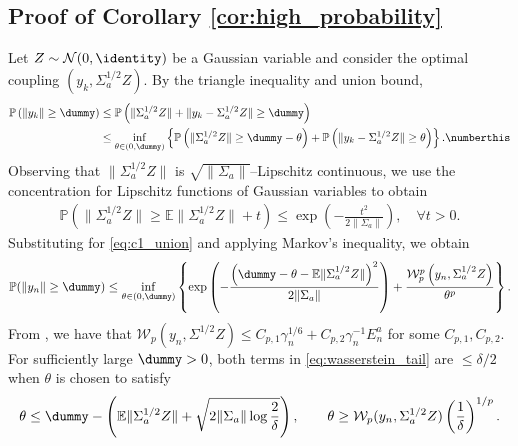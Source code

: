 \documentclass[11pt]{article}
\begin{document}
\subsection{Proof of Corollary \ref{cor:high_probability}}\label{app:high_probability}
        Let $Z \sim \mathcal{N}(0, \identity)$ be a Gaussian variable and consider the optimal coupling $(y_k, \Sigma_a^{1/2} Z)$. 
        By the triangle inequality and union bound, 
    \begin{align*}
        \mathbb{P}\left( \lVert y_k \rVert \geq \dummy \right) 
        &\leq 
        \mathbb{P}\left( \lVert \Sigma_a^{1/2} Z \rVert + \lVert y_k - \Sigma_a^{1/2} Z \rVert \geq \dummy \right) 
        \\ &
        \leq 
        \inf_{\theta \in (0, \dummy)} \left\{ \mathbb{P}\left(\lVert \Sigma_a^{1/2} Z \rVert \geq \dummy - \theta \right) + \mathbb{P}\left( \lVert y_k - \Sigma_a^{1/2} Z \rVert \geq \theta \right) \right\}. 
        \numberthis \label{eq:c1_union}
    \end{align*}
    Observing that $\lVert \Sigma_a^{1/2} Z \rVert$ is $\sqrt{\lVert \Sigma_a\rVert}$--Lipschitz continuous, we use the concentration for Lipschitz functions of Gaussian variables \citep[Theorem 5.6]{boucheron12} to obtain
    \begin{align*}
        \mathbb{P}\left( \lVert \Sigma_a^{1/2} Z \rVert \geq \mathbb{E}\lVert \Sigma_a^{1/2} Z \rVert + t \right) 
        \leq \exp \left(-\frac{t^2}{2\lVert \Sigma_a\rVert}\right) , \quad \forall t > 0. 
    \end{align*}
    Substituting for \eqref{eq:c1_union} and applying Markov's inequality, we obtain
\begin{equation}\label{eq:wasserstein_tail}
    \mathbb{P}(\lVert y_n \rVert \geq \dummy )
    \leq \inf_{\theta \in (0, \dummy)}  \left\{ \exp \left(-\frac{\left(\dummy - \theta - \mathbb{E}\lVert \Sigma_a^{1/2} Z \rVert\right)^2}{2 \lVert \Sigma_a \rVert} \right)
    + \frac{\mathcal{W}_p^{p} \left(y_n, \Sigma_a^{1/2} Z\right)}{\theta^p} \right\}.             
\end{equation}
From , we have that $\mathcal{W}_p (y_n, \Sigma^{1/2} Z) \leq C_{p,1} \gamma_n^{1/6} + C_{p, 2} \gamma_n^{-1} E_n^a$ for some $C_{p,1}, C_{p,2}$. 
For sufficiently large $\dummy > 0$, both terms in \eqref{eq:wasserstein_tail} are $\leq \delta/2$ when $\theta$ is chosen to satisfy
\begin{align*}
    \theta \leq \dummy - \left(\mathbb{E}\lVert \Sigma_a^{1/2}Z \rVert + \sqrt{2 \lVert \Sigma_a \rVert \log \frac{2}{\delta}} \right) 
    , \qquad 
    \theta \geq \mathcal{W}_p (y_n, \Sigma_a^{1/2} Z) \left( \frac{1}{\delta} \right)^{1/p}
    .
\end{align*}
\end{document}
